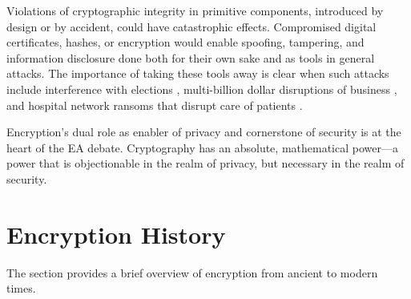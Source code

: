 
Violations of cryptographic integrity in primitive components, introduced by design or by accident, could have
catastrophic effects. Compromised digital certificates, hashes, or encryption would enable spoofing, tampering, and
information disclosure done both for their own sake and as tools in general attacks. The importance of taking these
tools away is clear when such attacks include interference with elections \cite{mueller_2018}, multi-billion dollar
disruptions of business \cite{greenberg_2018_notpetya}, and hospital network ransoms that disrupt care of patients
\cite{goodin_ransomware_2019}.


Encryption's dual role as enabler of privacy and cornerstone of security is at the heart of the EA debate. Cryptography
has an absolute, mathematical power---a power that is objectionable in the realm of privacy, but necessary in the realm
of security.


\section{Encryption History}
\label{sec-crypto-history}

The section provides a brief overview of encryption from ancient to modern times.

